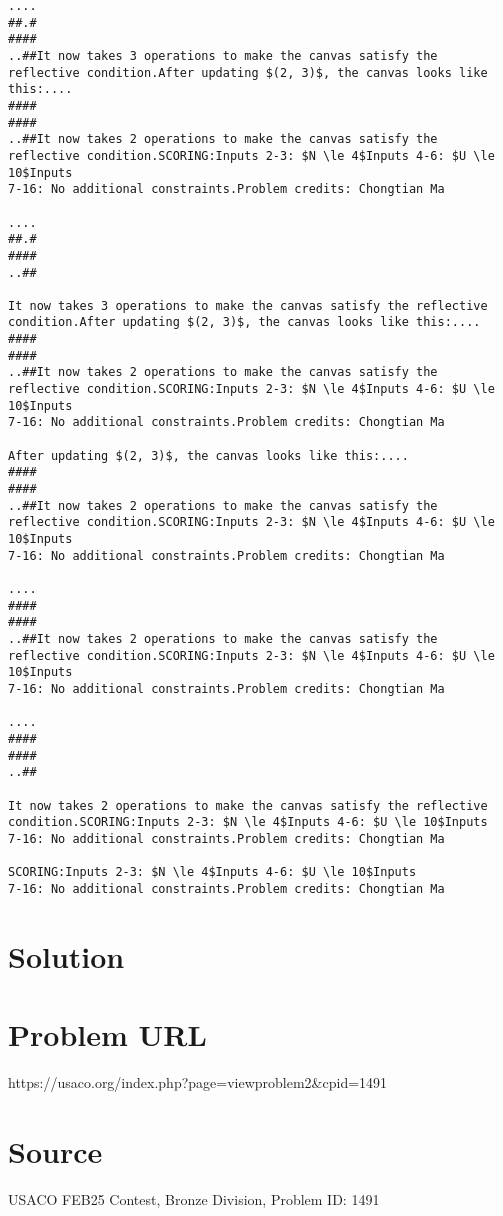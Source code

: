 \documentclass[12pt]{article}
\begin{document}
\begin{verbatim}
....
##.#
####
..##It now takes 3 operations to make the canvas satisfy the reflective condition.After updating $(2, 3)$, the canvas looks like this:....
####
####
..##It now takes 2 operations to make the canvas satisfy the reflective condition.SCORING:Inputs 2-3: $N \le 4$Inputs 4-6: $U \le 10$Inputs
7-16: No additional constraints.Problem credits: Chongtian Ma

....
##.#
####
..##

It now takes 3 operations to make the canvas satisfy the reflective condition.After updating $(2, 3)$, the canvas looks like this:....
####
####
..##It now takes 2 operations to make the canvas satisfy the reflective condition.SCORING:Inputs 2-3: $N \le 4$Inputs 4-6: $U \le 10$Inputs
7-16: No additional constraints.Problem credits: Chongtian Ma

After updating $(2, 3)$, the canvas looks like this:....
####
####
..##It now takes 2 operations to make the canvas satisfy the reflective condition.SCORING:Inputs 2-3: $N \le 4$Inputs 4-6: $U \le 10$Inputs
7-16: No additional constraints.Problem credits: Chongtian Ma

....
####
####
..##It now takes 2 operations to make the canvas satisfy the reflective condition.SCORING:Inputs 2-3: $N \le 4$Inputs 4-6: $U \le 10$Inputs
7-16: No additional constraints.Problem credits: Chongtian Ma

....
####
####
..##

It now takes 2 operations to make the canvas satisfy the reflective condition.SCORING:Inputs 2-3: $N \le 4$Inputs 4-6: $U \le 10$Inputs
7-16: No additional constraints.Problem credits: Chongtian Ma

SCORING:Inputs 2-3: $N \le 4$Inputs 4-6: $U \le 10$Inputs
7-16: No additional constraints.Problem credits: Chongtian Ma
\end{verbatim}

\section*{Solution}


\section*{Problem URL}
https://usaco.org/index.php?page=viewproblem2&cpid=1491

\section*{Source}
USACO FEB25 Contest, Bronze Division, Problem ID: 1491
\end{document}
